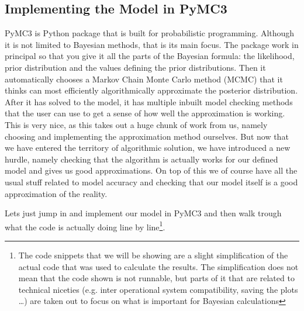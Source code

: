 \documentclass[12pt,a4paper,leqno]{report}
\theoremstyle{plain}
\theoremstyle{definition}
\theoremstyle{remark}
\begin{document}
\subsection{Implementing the Model in PyMC3}

PyMC3 is Python package that is built for probabilistic programming. Although it is not
limited to Bayesian methods, that is its main focus. The package work in principal so
that you give it all the parts of the Bayesian formula: the likelihood, prior
distribution and the values defining the prior distributions. Then it automatically
chooses a Markov Chain Monte Carlo method (MCMC) that it thinks can most efficiently
algorithmically approximate the posterior distribution. After it has solved to the
model, it has multiple inbuilt model checking methods that the user can use to get a
sense of how well the approximation is working. This is very nice, as this takes out a
huge chunk of work from us, namely choosing and implementing the approximation method
ourselves. But now that we have entered the territory of algorithmic solution, we have
introduced a new hurdle, namely checking that the algorithm is actually works for our
defined model and gives us good approximations. On top of this we of course have all the
usual stuff related to model accuracy and checking that our model itself is a good
approximation of the reality.

Lets just jump in and implement our model in PyMC3 and then walk trough what the code is
actually doing line by line\footnote{The code snippets that we will be showing are a
slight simplification of the actual code that was used to calculate the results. The simplification does not mean
that the code shown is not runnable, but parts of it that are related to technical niceties
(e.g. inter operational system compatibility, saving the plots \ldots) are taken out to focus on what is
important for Bayesian calculations}.
\end{document}
